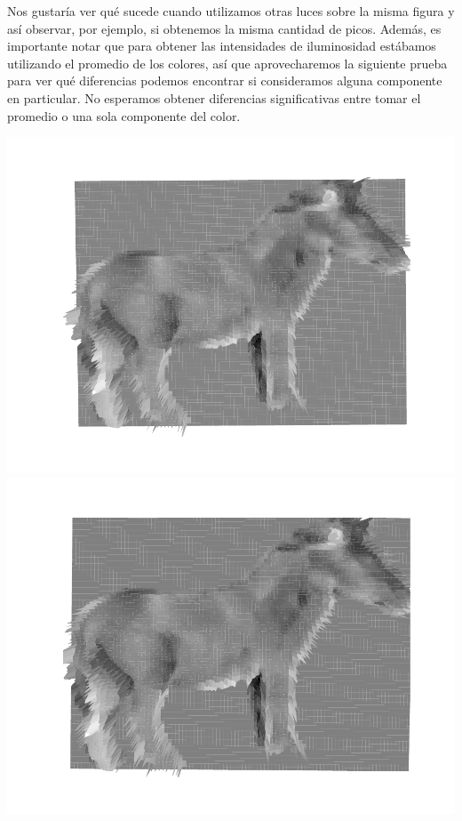 Nos gustaría ver qué sucede cuando utilizamos otras luces sobre la misma figura y así observar, por ejemplo, si obtenemos la misma cantidad de picos. Además, es importante notar que para obtener las intensidades de iluminosidad estábamos utilizando el promedio de los colores, así que aprovecharemos la siguiente prueba para ver qué diferencias podemos encontrar si consideramos alguna componente en particular. No esperamos obtener diferencias significativas entre tomar el promedio o una sola componente del color.



{\centering
    \includegraphics[scale=0.5]{informe/imagenes/profundidades/profCaballo012ColorProm.pdf}
    \includegraphics[scale=0.49]{informe/imagenes/profundidades/profCaballo012ColorAzul.pdf}
}
